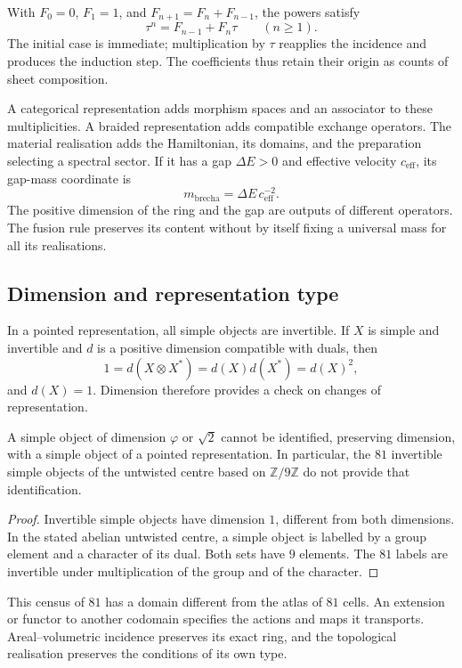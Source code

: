 With $F_0=0$, $F_1=1$, and $F_{n+1}=F_n+F_{n-1}$, the powers satisfy
\[
 \tau^n=F_{n-1}+F_n\tau\qquad(n\geq1).
\]
The initial case is immediate; multiplication by $\tau$ reapplies
the incidence and produces the induction step. The coefficients thus retain
their origin as counts of sheet composition.

A categorical representation adds morphism spaces and an
associator to these multiplicities. A braided representation adds
compatible exchange operators. The material realisation adds
the Hamiltonian, its domains, and the preparation selecting a
spectral sector. If it has a gap $\Delta E>0$ and effective velocity
$c_{\mathrm{eff}}$, its gap-mass coordinate is
\[
 m_{\mathrm{brecha}}=\Delta E\,c_{\mathrm{eff}}^{-2}.
\]
The positive dimension of the ring and the gap are outputs of different
operators. The fusion rule preserves its content without by
itself fixing a universal mass for all its realisations.

\subsection{Dimension and representation type}

In a pointed representation, all simple objects are
invertible. If $X$ is simple and invertible and $d$ is a positive
dimension compatible with duals, then
\[
 1=d(X\otimes X^*)=d(X)d(X^*)=d(X)^2,
\]
and $d(X)=1$. Dimension therefore provides a check on
changes of representation.

\begin{proposition}
\label{vi:prop:apuntada}
A simple object of dimension $\varphi$ or $\sqrt2$ cannot be identified,
preserving dimension, with a simple object of a pointed representation.
In particular, the $81$ invertible simple objects of the untwisted centre
based on $\mathbb Z/9\mathbb Z$ do not provide that identification.
\end{proposition}
\begin{proof}
Invertible simple objects have dimension $1$, different from both
dimensions. In the stated abelian untwisted centre, a simple object is
labelled by a group element and a character of its dual. Both
sets have $9$ elements. The $81$ labels are invertible
under multiplication of the group and of the character.
\end{proof}

This census of $81$ has a domain different from the atlas of $81$ cells.
An extension or functor to another codomain specifies the actions
and maps it transports. Areal--volumetric incidence preserves
its exact ring, and the topological realisation preserves the conditions
of its own type.

